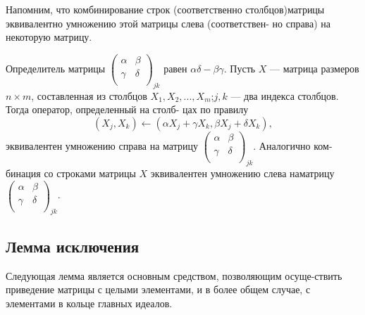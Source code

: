   Напомним, что комбинирование строк (соответственно столбцов)\linebreak матрицы эквивалентно умножению этой матрицы слева (соответствен- \linebreak но справа) на некоторую матрицу.
\begin{predl}  
  Определитель матрицы ${\left( \begin{array}{ccc}
\alpha & \beta \\
\gamma & \delta \\
\end{array} \right)}_{jk}$ равен $\alpha \delta - \beta \gamma$. Пусть $X$ --- матрица \linebreak размеров $n \times m$, составленная из столбцов $X_1, X_2, ..., X_m$;\linebreak $j,k$ --- два индекса столбцов. Тогда оператор, определенный на столб- \linebreak цах по правилу
$$(X_j, X_k)\gets (\alpha X_j + \gamma X_k, \beta X_j + \delta X_k),$$
эквивалентен умножению справа на матрицу ${\left( \begin{array}{ccc}
\alpha & \beta \\
\gamma & \delta \\
\end{array} \right)}_{jk}$. Аналогично ком-\linebreak бинация со строками матрицы $X$ эквивалентен умножению слева на\linebreak матрицу ${\left( \begin{array}{ccc}
\alpha & \beta \\
\gamma & \delta \\
\end{array} \right)}_{jk}$.\linebreak
\end{predl}
\subsection{Лемма исключения}
Следующая лемма является основным средством, позволяющим осуще-\linebreak ствить приведение матрицы с целыми элементами, и в более общем \linebreak случае, с элементами в кольце главных идеалов.\linebreak

